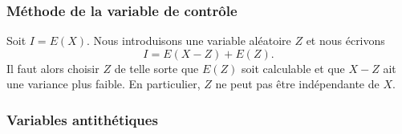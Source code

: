 \subsubsection{Méthode de la variable de contrôle}

Soit \( I=E(X)\). Nous introduisons une variable aléatoire \( Z\) et nous écrivons
\begin{equation}
	I=E(X-Z)+E(Z).
\end{equation}
Il faut alors choisir \( Z\) de telle sorte que \( E(Z)\) soit calculable et que \( X-Z\) ait une variance plus faible. En particulier, \( Z\) ne peut pas être indépendante de \( X\).

\subsubsection{Variables antithétiques}

